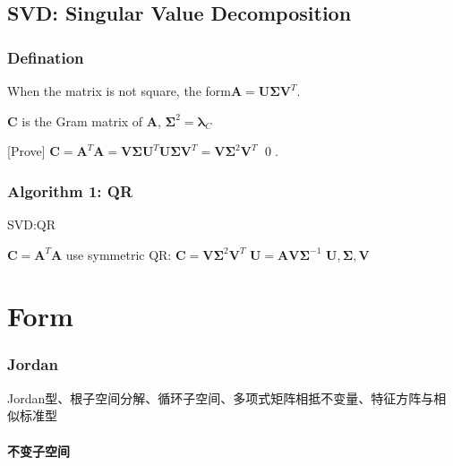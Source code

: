 \documentclass[UTF8]{../../09-Mathematics}
\begin{document}
\section{SVD: Singular Value Decomposition}


\subsection{Defination}

When the matrix is not square, the form$\boldsymbol  A = \boldsymbol  U  \boldsymbol \Sigma \boldsymbol V^T$.

\begin{lemma}
    $\boldsymbol  C$ is the  Gram matrix of $\boldsymbol  A$, $  \boldsymbol\Sigma^2 = \boldsymbol \lambda_C $

    [Prove] $\boldsymbol  C = \boldsymbol  A^T \boldsymbol  A =
    \boldsymbol  V  \boldsymbol \Sigma \boldsymbol U^T
    \boldsymbol  U  \boldsymbol \Sigma \boldsymbol V^T
    =\boldsymbol  V  \boldsymbol \Sigma^2 \boldsymbol  V^T$ \qed.
\end{lemma}


\subsection{Algorithm 1: QR}

\begin{algorithm}[H]
    \caption{SVD:QR}\label{algo:SVD:QR}
    \SetAlgoLined
    $\boldsymbol  C = \boldsymbol  A^T \boldsymbol  A$\;
    use symmetric QR: $\boldsymbol  C = \boldsymbol  V  \boldsymbol \Sigma^2 \boldsymbol  V^T$\;
    $\boldsymbol U = \boldsymbol A \boldsymbol  V \boldsymbol \Sigma^{-1}$\;
    \KwRet $\boldsymbol U, \boldsymbol \Sigma,\boldsymbol V $\;
\end{algorithm}


\chapter{Form}

\subsection{Jordan}

Jordan型、根子空间分解、循环子空间、多项式矩阵相抵不变量、特征方阵与相似标准型


\subsubsection{不变子空间
}
\end{document}

